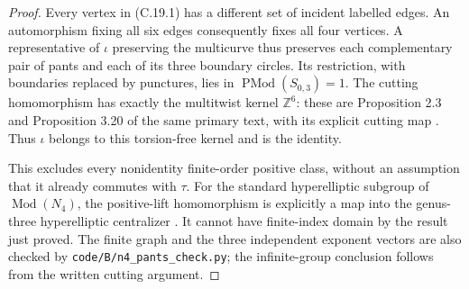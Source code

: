 \begin{proof}
Every vertex in (C.19.1) has a different set of incident labelled
edges. An automorphism fixing all six edges consequently fixes
all four vertices. A representative of $\iota$ preserving the
multicurve thus preserves each complementary pair of pants
and each of its three boundary circles. Its restriction, with
boundaries replaced by punctures, lies in
$\operatorname{PMod}(S_{0,3})=1$.
The cutting homomorphism has exactly the multitwist kernel
$\mathbb Z^6$: these are Proposition 2.3 and Proposition 3.20
of the same primary text, with its explicit cutting map
\cite{CextraFarbMargalit}. Thus $\iota$ belongs to this
torsion-free kernel and is the identity.

This excludes every nonidentity finite-order positive class,
without an assumption that it already commutes with $\tau$.
For the standard hyperelliptic subgroup of $\operatorname{Mod}(N_4)$,
the positive-lift homomorphism is explicitly a map into the
genus-three hyperelliptic centralizer
\cite[p.~1030]{CextraStukow2016}. It cannot have finite-index
domain by the result just proved. The finite graph and the
three independent exponent vectors are also checked by
\texttt{code/B/n4\_pants\_check.py}; the infinite-group
conclusion follows from the written cutting argument.
\end{proof}
